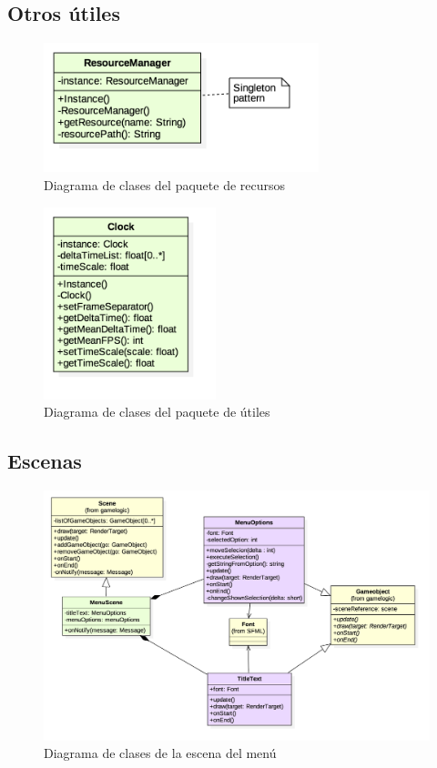 \subsection{Otros útiles}

\begin{figure}
	\centerline{\includegraphics[width=8cm]{otros/UML/png/alld/png/resources__diagramaDeClases_resources_0.png}}
	\caption{Diagrama de clases del paquete de recursos}
	\label{class:resources}
\end{figure}

\begin{figure}
	\centerline{\includegraphics[width=5cm]{otros/UML/png/alld/png/utils__diagramaDeClases_utils_10.png}}
	\caption{Diagrama de clases del paquete de útiles}
	\label{class:utils}
\end{figure}


\subsection{Escenas}

\begin{figure}
	\centerline{\includegraphics[width=15cm]{otros/UML/png/alld/png/gamelogic__menu__diagramaDeClases_scene_menu_6.png}}
	\caption{Diagrama de clases de la escena del menú}
	\label{class:scene}
\end{figure}

